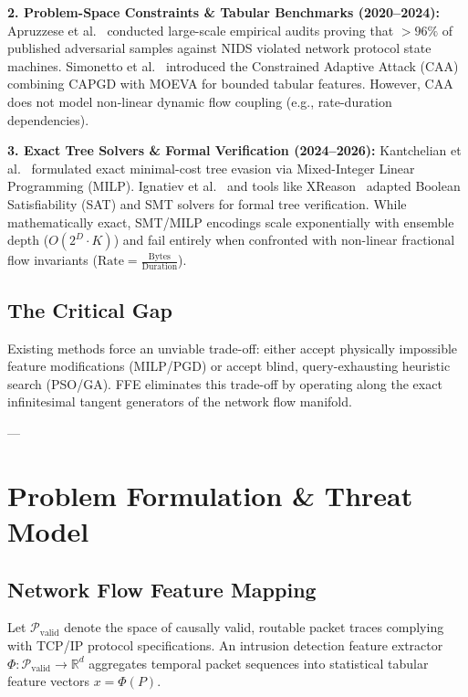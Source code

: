 \documentclass[10pt,journal,compsoc]{IEEEtran}
\begin{document}
\textbf{2. Problem-Space Constraints \& Tabular Benchmarks (2020--2024):} Apruzzese et al.~\cite{apruzzese2022role, apruzzese2023modeling} conducted large-scale empirical audits proving that $>96\%$ of published adversarial samples against NIDS violated network protocol state machines. Simonetto et al.~\cite{simonetto2021constrained} introduced the Constrained Adaptive Attack (CAA) combining CAPGD with MOEVA for bounded tabular features. However, CAA does not model non-linear dynamic flow coupling (e.g., rate-duration dependencies).

\textbf{3. Exact Tree Solvers \& Formal Verification (2024--2026):} Kantchelian et al.~\cite{kantchelian2016evasion} formulated exact minimal-cost tree evasion via Mixed-Integer Linear Programming (MILP). Ignatiev et al.~\cite{ignatiev2022formal} and tools like XReason~\cite{xreason2024} adapted Boolean Satisfiability (SAT) and SMT solvers for formal tree verification. While mathematically exact, SMT/MILP encodings scale exponentially with ensemble depth ($O(2^D \cdot K)$) and fail entirely when confronted with non-linear fractional flow invariants ($\text{Rate} = \frac{\text{Bytes}}{\text{Duration}}$).

\subsection{The Critical Gap}
Existing methods force an unviable trade-off: either accept physically impossible feature modifications (MILP/PGD) or accept blind, query-exhausting heuristic search (PSO/GA). FFE eliminates this trade-off by operating along the exact infinitesimal tangent generators of the network flow manifold.

---

\section{Problem Formulation \& Threat Model}

\subsection{Network Flow Feature Mapping}
Let $\mathcal{P}_{\text{valid}}$ denote the space of causally valid, routable packet traces complying with TCP/IP protocol specifications. An intrusion detection feature extractor $\Phi: \mathcal{P}_{\text{valid}} \to \mathbb{R}^d$ aggregates temporal packet sequences into statistical tabular feature vectors $x = \Phi(P)$.
\end{document}

